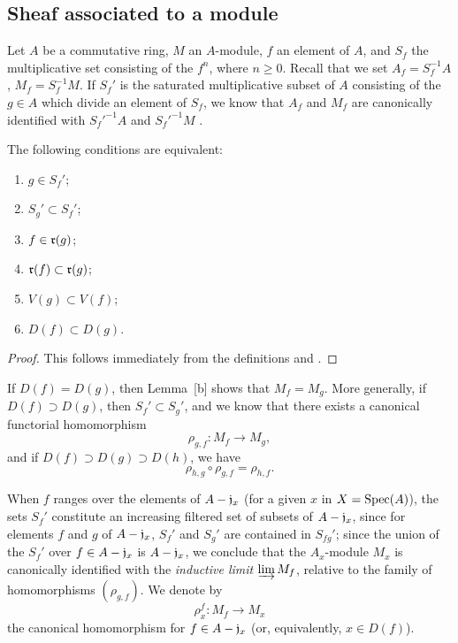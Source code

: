 \subsection{Sheaf associated to a module}
\label{subsection-assoc-sheaf}

\begin{env}[1.3.1]
\label{1.1.3.1}
Let $A$ be a commutative ring, $M$ an $A$-module, $f$ an element of $A$, and $S_f$ the multiplicative set consisting of the $f^n$, where $n\geqslant 0$.
Recall that we set $A_f=S_f^{-1}A$, $M_f=S_f^{-1}M$.
If $S_f'$ is the saturated multiplicative subset of $A$ consisting of the $g\in A$ which divide an element of $S_f$, we know that $A_f$ and $M_f$ are canonically identified with ${S_f'}^{-1}A$ and ${S_f'}^{-1}M$ .
\end{env}

\begin{lem}[1.3.2]
\label{1.1.3.2}
The following conditions are equivalent:
\begin{enumerate}[label=\emph{(\alph*)}]
    \item $g\in S_f'$;
    \item $S_g'\subset S_f'$;
    \item $f\in\mathfrak{r}(g)$;
    \item $\mathfrak{r}(f)\subset\mathfrak{r}(g)$;
    \item $V(g)\subset V(f)$;
    \item $D(f)\subset D(g)$.
\end{enumerate}
\end{lem}

\begin{proof}
\label{proof-1.1.3.2}
This follows immediately from the definitions and .
\end{proof}

\begin{env}[1.3.3]
\label{1.1.3.3}
If $D(f)=D(g)$, then Lemma~[b] shows that $M_f=M_g$.
More generally, if $D(f)\supset D(g)$, then $S_f'\subset S_g'$, and we know  that there exists a canonical functorial homomorphism
\[
  \rho_{g,f}:M_f\to M_g,
\]
and if $D(f)\supset D(g)\supset D(h)$, we have 
\[
  \rho_{h,g}\circ\rho_{g,f}=\rho_{h,f}.
  \tag{1.3.3.1}
\]
\end{env}

When $f$ ranges over the elements of $A-\mathfrak{j}_x$ (for a given $x$ in $X={\mathop{\mathrm{Spec}}\nolimits}(A)$), the sets $S_f'$ constitute an increasing filtered set of subsets of $A-\mathfrak{j}_x$, since for elements $f$ and $g$ of $A-\mathfrak{j}_x$, $S_f'$ and $S_g'$ are contained in $S_{fg}'$;
since the union of the $S_f'$ over $f\in A-\mathfrak{j}_x$ is $A-\mathfrak{j}_x$, we conclude  that the $A_x$-module $M_x$ is canonically identified with the \emph{inductive limit} $\varinjlim M_f$, relative to the family of homomorphisms $(\rho_{g,f})$.
We denote by
\[
  \rho_x^f:M_f\to M_x
\]
the canonical homomorphism for $f\in A-\mathfrak{j}_x$ (or, equivalently, $x\in D(f)$).

